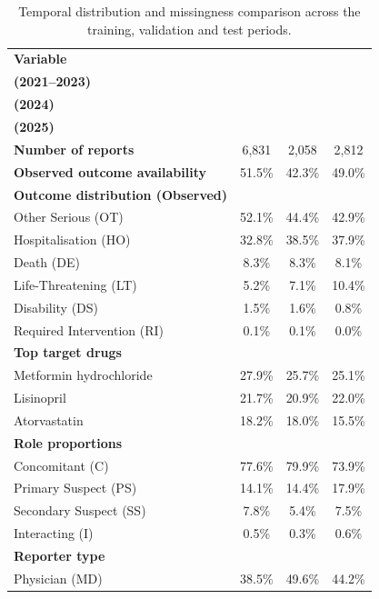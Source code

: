 \documentclass[10pt]{article}
\begin{document}
\begin{table}[htbp]
\caption{Temporal distribution and missingness comparison across the training, validation and test periods.}
\label{tab:temporal_distribution}
\centering\small\setlength{\tabcolsep}{4pt}
\begin{tabularx}{\textwidth}{|>{\raggedright\arraybackslash}X|c|c|c|}
\hline
\textbf{Variable} & \makecell[c]{\textbf{Training Period}\\ \textbf{(2021--2023)}} & \makecell[c]{\textbf{Validation Period}\\ \textbf{(2024)}} & \makecell[c]{\textbf{Test Period}\\ \textbf{(2025)}} \\
\hline
\textbf{Number of reports} & 6{,}831 & 2{,}058 & 2{,}812 \\
\hline
\textbf{Observed outcome availability} & 51.5\% & 42.3\% & 49.0\% \\
\hline
\textbf{Outcome distribution (Observed)} & & & \\
\quad Other Serious (OT) & 52.1\% & 44.4\% & 42.9\% \\
\quad Hospitalisation (HO) & 32.8\% & 38.5\% & 37.9\% \\
\quad Death (DE) & 8.3\% & 8.3\% & 8.1\% \\
\quad Life-Threatening (LT) & 5.2\% & 7.1\% & 10.4\% \\
\quad Disability (DS) & 1.5\% & 1.6\% & 0.8\% \\
\quad Required Intervention (RI) & 0.1\% & 0.1\% & 0.0\% \\
\hline
\textbf{Top target drugs} & & & \\
\quad Metformin hydrochloride & 27.9\% & 25.7\% & 25.1\% \\
\quad Lisinopril & 21.7\% & 20.9\% & 22.0\% \\
\quad Atorvastatin & 18.2\% & 18.0\% & 15.5\% \\
\hline
\textbf{Role proportions} & & & \\
\quad Concomitant (C) & 77.6\% & 79.9\% & 73.9\% \\
\quad Primary Suspect (PS) & 14.1\% & 14.4\% & 17.9\% \\
\quad Secondary Suspect (SS) & 7.8\% & 5.4\% & 7.5\% \\
\quad Interacting (I) & 0.5\% & 0.3\% & 0.6\% \\
\hline
\textbf{Reporter type} & & & \\
\quad Physician (MD) & 38.5\% & 49.6\% & 44.2\% \\

\end{tabularx}
\end{table}
\end{document}
